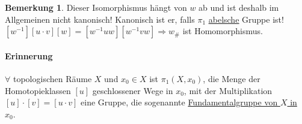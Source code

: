 \documentclass[a4paper,11pt,notitlepage]{report}
\theoremstyle{definition}
\newtheorem{remark}{Bemerkung}[chapter]
\begin{document}
\begin{remark}
	Dieser Isomorphismus hängt von $w$ ab und ist deshalb im Allgemeinen nicht kanonisch!
	Kanonisch ist er, falls $\pi_1$ \underline{\underline{abelsche}} Gruppe ist!
	\newline
$[w^{-1}][u \cdot v][w] = [w^{-1} u w] [w^{-1} v w] \Rightarrow w_\#$ ist Homomorphismus.

\end{remark}


\paragraph{Erinnerung} $\forall$ topologischen Räume $X$ und $x_0 \in X$ ist $\pi_1(X,x_0)$, die Menge der Homotopieklassen $[u]$ geschlossener Wege in $x_0$, mit der Multiplikation $[u] \cdot [v] = [u \cdot v]$ eine Gruppe, die sogenannte \underline{Fundamentalgruppe von $X$ in $x_0$}.
\newpage
\end{document}
